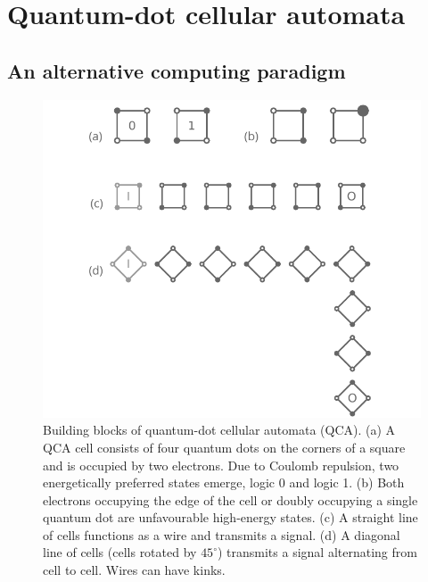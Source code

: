 \chapter{Quantum-dot cellular automata}
\label{ch:QCA_intro}
\graphicspath{{../gfx/chapter01/}}



\section{An alternative computing paradigm}
\label{sec:an_alternative_computing_paradigm}

\begin{figure}
  \center
  \includegraphics{intro_qca}
  \caption{
Building blocks of quantum-dot cellular automata (QCA). (a) A QCA cell consists
of four quantum dots on the corners of a square and is occupied by two
electrons. Due to Coulomb repulsion, two energetically preferred states emerge,
logic 0 and logic 1. (b) Both electrons occupying the edge of the cell or
doubly occupying a single quantum dot are unfavourable high-energy states. (c) A
straight line of cells functions as a wire and transmits a signal. (d) A
diagonal line of cells (cells rotated by $45^{\circ}$) transmits a signal
alternating from cell to cell. Wires can have kinks.
}
  \label{fig:intro_qca}
\end{figure}
%
